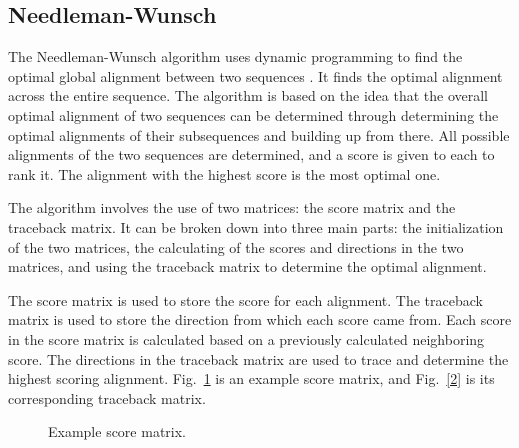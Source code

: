 \documentclass[conference]{IEEEtran}
\begin{document}
\subsection{Needleman-Wunsch}
The Needleman-Wunsch algorithm uses dynamic programming to find the optimal global alignment between two sequences \cite{vladimir}. It finds the optimal alignment across the entire sequence. The algorithm is based on the idea that the overall optimal alignment of two sequences can be determined through determining the optimal alignments of their subsequences and building up from there. All possible alignments of the two sequences are determined, and a score is given to each to rank it. The alignment with the highest score is the most optimal one.

The algorithm involves the use of two matrices: the score matrix and the traceback matrix. It can be broken down into three main parts: the initialization of the two matrices, the calculating of the scores and directions in the two matrices, and using the traceback matrix to determine the optimal alignment.

The score matrix is used to store the score for each alignment. The traceback matrix is used to store the direction from which each score came from. Each score in the score matrix is calculated based on a previously calculated neighboring score. The directions in the traceback matrix are used to trace and determine the highest scoring alignment. Fig.~\ref{1} is an example score matrix, and Fig.~\ref{2} is its corresponding traceback matrix.

\begin{figure}[htbp]
\centerline{}
\caption{Example score matrix. \cite{vladimir}}
\label{1}
\end{figure}
\end{document}
